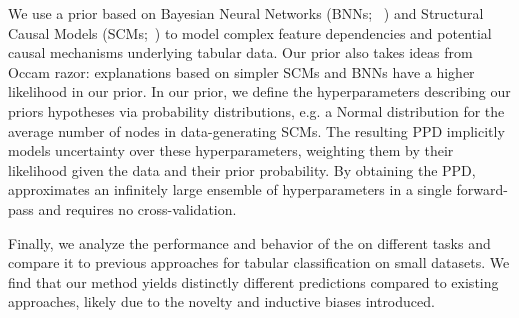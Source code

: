 \documentclass{article}
\begin{document}
We use a prior based on Bayesian Neural Networks (BNNs; ~\citealt{neal-bayes96a,gal-phdthesis16a}) and Structural Causal Models (SCMs;~\citealt{pearl_2009,causalinferencelearningbook}) to model complex feature dependencies and potential causal mechanisms underlying tabular data.
Our prior also takes ideas from Occam razor: explanations based on simpler SCMs and BNNs have a higher likelihood in our prior.
In our prior, we define the hyperparameters describing our priors hypotheses via probability distributions, e.g. a Normal distribution for the average number of nodes in data-generating SCMs.
The resulting PPD implicitly models uncertainty over these hyperparameters, weighting them by their likelihood given the data and their prior probability.
By obtaining the PPD, \methodname{} approximates an infinitely large ensemble of hyperparameters in a single forward-pass and requires no cross-validation.

Finally, we analyze the performance and behavior of the \methodname{} on different tasks and compare it to previous approaches for tabular classification on small datasets. We find that our method yields distinctly different predictions compared to existing approaches, likely due to the novelty and inductive biases introduced.


\end{document}
